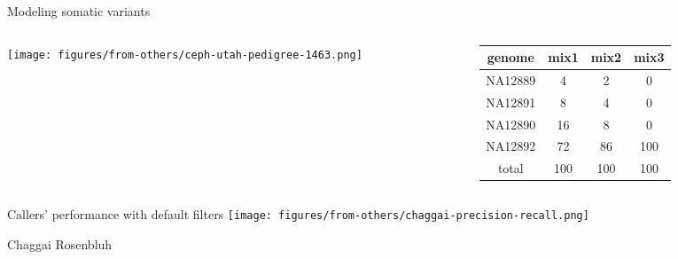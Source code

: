 \documentclass{beamer}
\begin{document}
\begin{frame}[label=benchmark]{Modeling somatic variants}
\begin{center}
\begin{columns}[t]
\begin{column}{0.5\textwidth}

\texttt{[image: figures/from-others/ceph-utah-pedigree-1463.png]}
\end{column}

\begin{column}{0.5\textwidth}

\small
{
\begin{tabular}{cccc}
genome & mix1 & mix2 & mix3\\
\hline
NA12889 & 4 & 2 & 0\\
NA12891 & 8 & 4 & 0\\
NA12890 & 16 & 8 & 0\\
NA12892 & 72 & 86 & 100\\
\hline
total & 100 & 100 & 100\\
\end{tabular}
}
\end{column}
\end{columns}
\end{center}
\end{frame}

\begin{frame}[label=precrecall]{Callers' performance with default filters}
\texttt{[image: figures/from-others/chaggai-precision-recall.png]}

\tiny{Chaggai Rosenbluh}
\end{frame}
\end{document}
